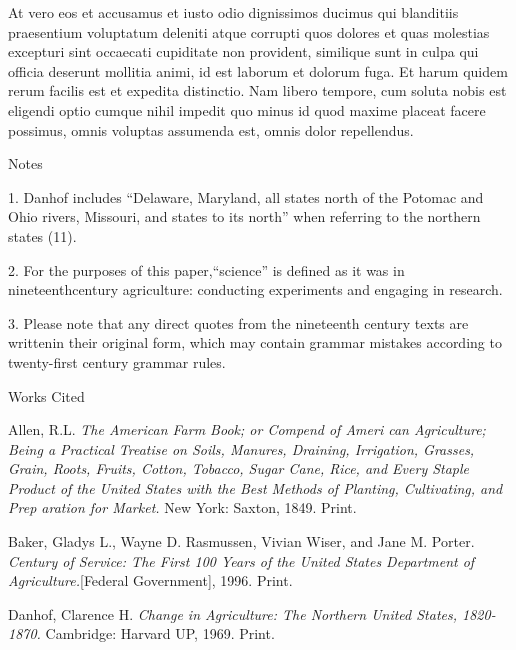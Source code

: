 \documentclass[12pt]{article}
\newcommand{\bibent}{\noindent \hangindent 40pt}
\newenvironment{workscited}{\newpage \begin{center} Works Cited \end{center}}{\newpage }
\begin{document}
\begin{flushleft}
At vero eos et accusamus et iusto odio dignissimos ducimus qui blanditiis praesentium voluptatum deleniti atque corrupti quos dolores et quas molestias excepturi sint occaecati cupiditate non provident, similique sunt in culpa qui officia deserunt mollitia animi, id est laborum et dolorum fuga. Et harum quidem rerum facilis est et expedita distinctio. Nam libero tempore, cum soluta nobis est eligendi optio cumque nihil impedit quo minus id quod maxime placeat facere possimus, omnis voluptas assumenda est, omnis dolor repellendus. 
\newpage


\begin{center}
Notes
\end{center}


\setlength{\parindent}{0.5in}

1. Danhof includes “Delaware, Maryland, all states north of the Potomac and Ohio rivers, Missouri, and states to its north” when referring to the northern states (11).


2. For the purposes of this paper,“science” is defined as it was in nineteenthcentury agriculture: conducting experiments and engaging in research.


3. Please note that any direct quotes from the nineteenth century texts are writtenin their original form, which may contain grammar mistakes according to twenty-first century grammar rules.

\begin{workscited}

\bibent
Allen, R.L. \textit{The American Farm Book; or Compend of Ameri can Agriculture; Being a Practical Treatise on Soils, Manures, Draining, Irrigation, Grasses, Grain, Roots, Fruits, Cotton, Tobacco, Sugar Cane, Rice, and Every Staple Product of the United States with the Best Methods of Planting, Cultivating, and Prep aration for Market.} New York: Saxton, 1849. Print.

\bibent
Baker, Gladys L., Wayne D. Rasmussen, Vivian Wiser, and Jane M. Porter. \textit{Century of Service: The First 100 Years of the United States Department of Agriculture.}[Federal Government], 1996. Print.

\bibent
Danhof, Clarence H. \textit{Change in Agriculture: The Northern United States, 1820-1870.} Cambridge: Harvard UP, 1969. Print.


\end{workscited}

\end{flushleft}
\end{document}
